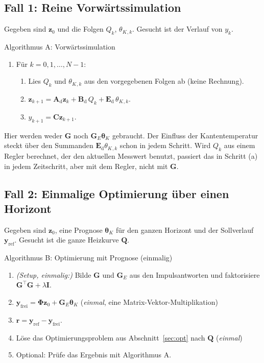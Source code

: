 \documentclass[11pt,a4paper]{article}
\numberwithin{equation}{section}
\newcommand{\thK}{\theta_{K}}
\newcommand{\vthK}{\symbf{\theta}_{K}}
\newcommand{\mC}{\mathbf{C}}
\newcommand{\mI}{\mathbf{I}}
\newcommand{\mG}{\mathbf{G}}
\newcommand{\mGE}{\mathbf{G}_{E}}
\newcommand{\mAd}{\mathbf{A}_{\mathrm d}}
\newcommand{\mBd}{\mathbf{B}_{\mathrm d}}
\newcommand{\mEd}{\mathbf{E}_{\mathrm d}}
\newcommand{\mPhi}{\symbf{\Phi}}
\newcommand{\vz}{\mathbf{z}}
\newcommand{\vy}{\mathbf{y}}
\newcommand{\vQ}{\mathbf{Q}}
\newcommand{\vr}{\mathbf{r}}
\begin{document}
\subsection{Fall 1: Reine Vorwärtssimulation}

Gegeben sind $\vz_0$ und die Folgen $Q_k$, $\thK{}_{,k}$. Gesucht ist der Verlauf von $y_k$.

\begin{algo}{Algorithmus A: Vorwärtssimulation}
\begin{enumerate}[leftmargin=1.4em]
 \item Für $k=0,1,\dots,N-1$:
 \begin{enumerate}[label=(\alph*)]
  \item Lies $Q_k$ und $\thK{}_{,k}$ aus den vorgegebenen Folgen ab (keine Rechnung).
  \item $\vz_{k+1}=\mAd\vz_k+\mBd\,Q_k+\mEd\,\thK{}_{,k}$.
  \item $y_{k+1}=\mC\vz_{k+1}$.
 \end{enumerate}
\end{enumerate}
\end{algo}

Hier werden weder $\mG$ noch $\mGE\vthK$ gebraucht. Der Einfluss der Kantentemperatur steckt über den Summanden $\mEd\thK{}_{,k}$ schon in jedem Schritt. Wird $Q_k$ aus einem Regler berechnet, der den aktuellen Messwert benutzt, passiert das in Schritt (a) in jedem Zeitschritt, aber mit dem Regler, nicht mit $\mG$.

\subsection{Fall 2: Einmalige Optimierung über einen Horizont}

Gegeben sind $\vz_0$, eine Prognose $\vthK$ für den ganzen Horizont und der Sollverlauf $\vy_\mathrm{ref}$. Gesucht ist die ganze Heizkurve $\vQ$.

\begin{algo}{Algorithmus B: Optimierung mit Prognose (einmalig)}
\begin{enumerate}[leftmargin=1.4em]
 \item \emph{(Setup, einmalig:)} Bilde $\mG$ und $\mGE$ aus den Impulsantworten und faktorisiere $\mG^\top\mG+\lambda\mI$.
 \item $\vy_\mathrm{frei}=\mPhi\vz_0+\mGE\vthK$ \hfill (\emph{einmal}, eine Matrix-Vektor-Multiplikation)
 \item $\vr=\vy_\mathrm{ref}-\vy_\mathrm{frei}$.
 \item Löse das Optimierungsproblem aus Abschnitt~\ref{sec:opt} nach $\vQ$ \hfill (\emph{einmal})
 \item Optional: Prüfe das Ergebnis mit Algorithmus A.
\end{enumerate}
\end{algo}
\end{document}
